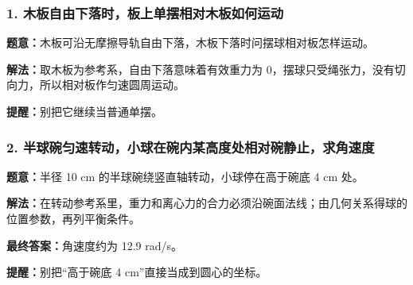 \documentclass[12pt,a4paper]{ctexart}
\begin{document}
\subsubsection*{1. 木板自由下落时，板上单摆相对木板如何运动}
\begin{tcolorbox}[colback=gray!2!white,colframe=black!60,title={题目}]
\textbf{题意：}木板可沿无摩擦导轨自由下落，木板下落时问摆球相对板怎样运动。\par
\end{tcolorbox}
\begin{tcolorbox}[colback=blue!2!white,colframe=blue!55!black,title={完整答案}]
\textbf{解法：}取木板为参考系，自由下落意味着有效重力为 0，摆球只受绳张力，没有切向力，所以相对板作匀速圆周运动。\par


\end{tcolorbox}
\begin{tcolorbox}[colback=red!2!white,colframe=red!55!black,title={易错点}]
\textbf{提醒：}别把它继续当普通单摆。\par
\end{tcolorbox}

\subsubsection*{2. 半球碗匀速转动，小球在碗内某高度处相对碗静止，求角速度}
\begin{tcolorbox}[colback=gray!2!white,colframe=black!60,title={题目}]
\textbf{题意：}半径 10 cm 的半球碗绕竖直轴转动，小球停在高于碗底 4 cm 处。\par
\end{tcolorbox}
\begin{tcolorbox}[colback=blue!2!white,colframe=blue!55!black,title={完整答案}]
\textbf{解法：}在转动参考系里，重力和离心力的合力必须沿碗面法线；由几何关系得球的位置参数，再列平衡条件。\par
\textbf{最终答案：}角速度约为 12.9 rad/s。\par

\end{tcolorbox}
\begin{tcolorbox}[colback=red!2!white,colframe=red!55!black,title={易错点}]
\textbf{提醒：}别把“高于碗底 4 cm”直接当成到圆心的坐标。\par
\end{tcolorbox}
\end{document}
